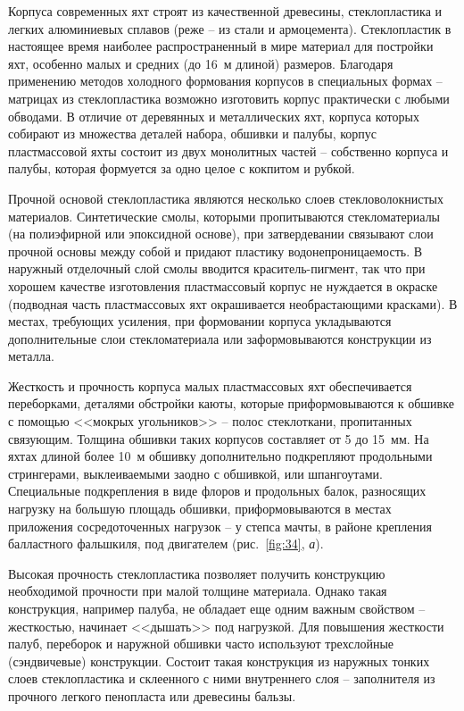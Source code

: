 \documentclass[a4paper, 12pt, twoside, final, book, russian, fittopage, cyremdash]{ncc}
\newcommand{\ris}[1]{\ref{fig:#1}}
\begin{document}
Корпуса современных яхт строят из качественной древесины, стеклопластика и легких алюминиевых сплавов (реже \--- из стали и армоцемента). Стеклопластик в настоящее время наиболее распространенный в мире материал для постройки яхт, особенно малых и средних (до 16~м длиной) размеров. Благодаря применению методов холодного формования корпусов в специальных формах \--- матрицах из стеклопластика возможно изготовить корпус практически с любыми обводами. В отличие от деревянных и металлических яхт, корпуса которых собирают из множества деталей набора, обшивки и палубы, корпус пластмассовой яхты состоит из двух монолитных частей \--- собственно корпуса и палубы, которая формуется за одно целое с кокпитом и рубкой.

Прочной основой стеклопластика являются несколько слоев стекловолокнистых материалов. Синтетические смолы, которыми пропитываются стекломатериалы (на полиэфирной или эпоксидной основе), при затвердевании связывают слои прочной основы между собой и придают пластику водонепроницаемость. В наружный отделочный слой смолы вводится краситель-пигмент, так что при хорошем качестве изготовления пластмассовый корпус не нуждается в окраске (подводная часть пластмассовых яхт окрашивается необрастающими красками). В местах, требующих усиления, при формовании корпуса укладываются дополнительные слои стекломатериала или заформовываются конструкции из металла. 

Жесткость и прочность корпуса малых пластмассовых яхт обеспечивается переборками, деталями обстройки каюты, которые приформовываются к обшивке с помощью <<мокрых угольников>> \--- полос стеклоткани, пропитанных связующим. Толщина обшивки таких корпусов составляет от 5 до 15~мм. На яхтах длиной более 10~м обшивку дополнительно подкрепляют продольными стрингерами, выклеиваемыми заодно с обшивкой, или шпангоутами. Специальные подкрепления в виде флоров и продольных балок, разносящих нагрузку на большую площадь обшивки, приформовываются в местах приложения сосредоточенных нагрузок \--- у степса мачты, в районе крепления балластного фальшкиля, под двигателем (рис.~\ris{34}, \textit{а}).

Высокая прочность стеклопластика позволяет получить конструкцию необходимой прочности при малой толщине материала. Однако такая конструкция, например палуба, не обладает еще одним важным свойством \--- жесткостью, начинает <<дышать>> под нагрузкой. Для повышения жесткости палуб, переборок и наружной обшивки часто используют трехслойные (сэндвичевые) конструкции. Состоит такая конструкция из наружных тонких слоев стеклопластика и склеенного с ними внутреннего слоя \--- заполнителя из прочного легкого пенопласта или древесины бальзы. 
\end{document}

